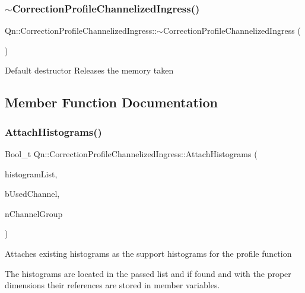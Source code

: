 \subsubsection{\texorpdfstring{$\sim$\+Correction\+Profile\+Channelized\+Ingress()}{~CorrectionProfileChannelizedIngress()}}
{\footnotesize\ttfamily Qn\+::\+Correction\+Profile\+Channelized\+Ingress\+::$\sim$\+Correction\+Profile\+Channelized\+Ingress (\begin{DoxyParamCaption}{ }\end{DoxyParamCaption})\hspace{0.3cm}{\ttfamily [virtual]}}

Default destructor Releases the memory taken 

\subsection{Member Function Documentation}
\mbox{\label{classQn_1_1CorrectionProfileChannelizedIngress_a770f44f4c5e700a71eb5a2cf5edab1a2}} 
\subsubsection{\texorpdfstring{Attach\+Histograms()}{AttachHistograms()}}
{\footnotesize\ttfamily Bool\+\_\+t Qn\+::\+Correction\+Profile\+Channelized\+Ingress\+::\+Attach\+Histograms (\begin{DoxyParamCaption}\item[{T\+List $\ast$}]{histogram\+List,  }\item[{const Bool\+\_\+t $\ast$}]{b\+Used\+Channel,  }\item[{const Int\+\_\+t $\ast$}]{n\+Channel\+Group }\end{DoxyParamCaption})\hspace{0.3cm}{\ttfamily [virtual]}}

Attaches existing histograms as the support histograms for the profile function

The histograms are located in the passed list and if found and with the proper dimensions their references are stored in member variables.

